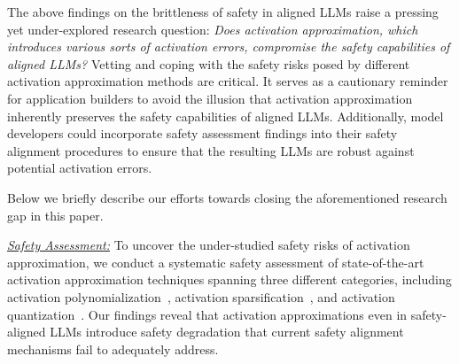  The above findings on the brittleness of safety in aligned LLMs raise a pressing yet under-explored research question:
\emph{Does activation approximation, which introduces various sorts of activation errors, compromise the safety capabilities of aligned LLMs?} 
Vetting and coping with the safety risks posed by different activation approximation methods are critical. It serves as a cautionary reminder for application builders to avoid the illusion that activation approximation inherently preserves the safety capabilities of aligned LLMs. Additionally, model developers could incorporate safety assessment findings into their safety alignment procedures to ensure that the resulting LLMs are robust against potential activation errors.


 Below we briefly describe our efforts towards closing the aforementioned research gap in this paper.

\noindent\underline{\textit{Safety Assessment:}} To uncover the under-studied safety risks of activation approximation, we conduct a systematic safety assessment of state-of-the-art activation approximation techniques spanning three different categories, including activation polynomialization~\cite{hao2022iron, pang2024bolt, lu2023bumblebee, zhang2024secure}, activation sparsification~\cite{liu2024training, zhang2024relu, mirzadeh2023relu}, and activation quantization~\cite{yao2022zeroquant, liu2023qllm, shao2023omniquant, xiao2023smoothquant}. Our findings reveal that activation approximations even in safety-aligned LLMs introduce safety degradation that current safety alignment mechanisms fail to adequately address.


